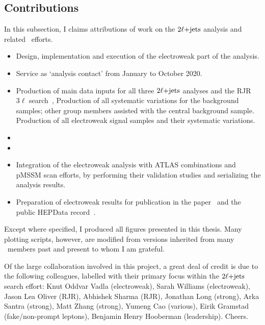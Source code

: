 \FloatBarrier
\subsection{Contributions}

In this subsection, I claims attributions of work on the $2\ell\mathrm{+jets}$ analysis
and related \atlas\ efforts.

\begin{itemize}
\item Design, implementation and execution of the electroweak part of the analysis.
\item Service as `analysis contact' from January to October 2020.
\item Production of main data inputs for all three $2\ell\mathrm{+jets}$ analyses
and the RJR $3\ell$ search~\cite{atlas_rjr_3l_SUSY_2019_09},
Production of all systematic variations for the background samples;
other group members assisted with the central background sample.
Production of all electroweak signal samples and their systematic variations.
\item {}
\item {}
\item Integration of the electroweak analysis with ATLAS combinations and
pMSSM scan efforts, by performing their validation studies and serializing the
analysis results.
\item Preparation of electroweak results for publication in the
paper~\cite{atlas2022searches} and the public HEPData
record~\cite{maguire2017hepdata}.
\end{itemize}
Except where specified, I produced all figures presented in this thesis.
Many plotting scripts, however, are modified from versions inherited from
many \atlas\ members past and present to whom I am grateful.

Of the large collaboration involved in this project, a great deal of credit is
due to the following colleagues, labelled with their primary focus within
the $2\ell\mathrm{+jets}$ search effort:
Knut Oddvar Vadla (electroweak),
Sarah Williams (electroweak),
Jason Lea Oliver (RJR),
Abhishek Sharma (RJR),
Jonathan Long (strong),
Arka Santra (strong),
Matt Zhang (strong),
Yumeng Cao (various),
Eirik Gramstad (fake/non-prompt leptons),
Benjamin Henry Hooberman (leadership).
Cheers.

